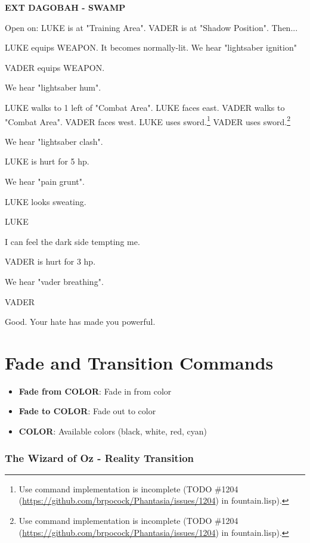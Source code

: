 \documentclass[11pt,letterpaper,oldstylefigures]{memoir}
\newcommand{\slugline}[1]{\nobreak\textbf{\MakeUppercase{#1}}\par\nobreak\vspace{1\baselineskip}}
\newcommand{\speaker}[1]{\nobreak\hspace*{0.333\textwidth}\MakeUppercase{#1}\par\nobreak\vspace{0.5\baselineskip}}
\newcommand{\dialogue}[1]{\nobreak\hspace*{0.25\textwidth}\begin{minipage}{0.5\textwidth}#1\end{minipage}\par\vspace{1\baselineskip}}
\newcommand{\stagedir}[1]{#1\par\vspace{1\baselineskip}}
\newenvironment{FountainExample}
  {\begingroup
  \ttfamily\small
   \setlength{\parindent}{0pt}
  \setlength{\parskip}{0.5em}
  \allowdisplaybreaks
  \setlength{\displaywidowpenalty}{0}
  \setlength{\widowpenalty}{0}
  \setlength{\clubpenalty}{0}
  \setlength{\interlinepenalty}{0}
}
  {\endgroup}
\newcommand{\fountain}[1]{\textbf{#1}}
\begin{document}
\begin{FountainExample}
\slugline{EXT DAGOBAH - SWAMP}

\stagedir{Open on: LUKE is at "Training Area". VADER is at "Shadow Position". Then...}

\stagedir{LUKE equips WEAPON. It becomes normally-lit. We hear "lightsaber ignition"}

\stagedir{VADER equips WEAPON.}
\stagedir{We hear "lightsaber hum".}

\stagedir{LUKE walks to 1 left of "Combat Area". LUKE faces east.
VADER walks to "Combat Area". VADER faces west. LUKE uses sword.\footnote{Use command implementation is incomplete (TODO \#1204 (\href{https://github.com/brpocock/Phantasia/issues/1204}{https://github.com/brpocock/Phantasia/issues/1204}) in fountain.lisp).} VADER uses sword.\footnote{Use command implementation is incomplete (TODO \#1204 (\href{https://github.com/brpocock/Phantasia/issues/1204}{https://github.com/brpocock/Phantasia/issues/1204}) in fountain.lisp).}}

\stagedir{We hear "lightsaber clash".}

\stagedir{LUKE is hurt for 5 hp.}

\stagedir{We hear "pain grunt".}

\stagedir{LUKE looks sweating.}

\speaker{LUKE}
\dialogue{I can feel the dark side tempting me.}

\stagedir{VADER is hurt for 3 hp.}

\stagedir{We hear "vader breathing".}

\speaker{VADER}
\dialogue{Good. Your hate has made you powerful.}
\end{FountainExample}

\section{Fade and Transition Commands}
\begin{itemize}
\item \fountain{Fade from COLOR}: Fade in from color
\item \fountain{Fade to COLOR}: Fade out to color
\item \fountain{COLOR}: Available colors (black, white, red, cyan)
\end{itemize}

\subsubsection*{The Wizard of Oz - Reality Transition}
\label{ex:wizard-of-oz-reality-transition}
\end{document}

